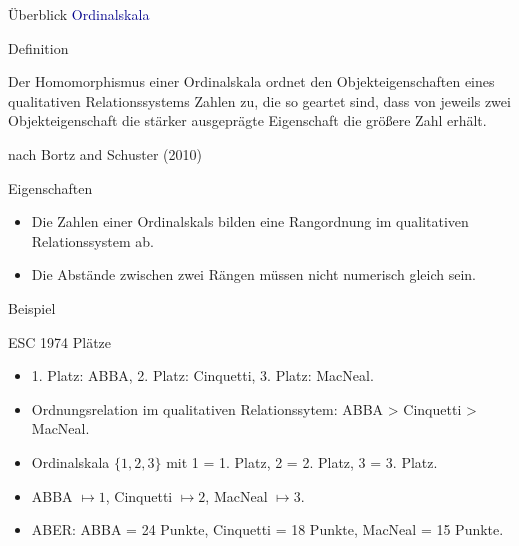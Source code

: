 \documentclass[
  8pt,
  ignorenonframetext,
]{beamer}
\providecommand{\tightlist}{%
  \setlength{\itemsep}{0pt}\setlength{\parskip}{0pt}}
\begin{document}
\begin{frame}{Überblick}
\protect\hypertarget{uxfcberblick-10}{}
\textcolor{darkblue}{Ordinalskala}

Definition

\small

Der Homomorphismus einer Ordinalskala ordnet den Objekteigenschaften
eines qualitativen Relationssystems Zahlen zu, die so geartet sind, dass
von jeweils zwei Objekteigenschaft die stärker ausgeprägte Eigenschaft
die größere Zahl erhält.

\footnotesize
\flushright

nach Bortz and Schuster (2010)

\justifying
\normalsize

Eigenschaften

\small

\begin{itemize}
\tightlist
\item
  Die Zahlen einer Ordinalskals bilden eine Rangordnung im qualitativen
  Relationssystem ab.
\item
  Die Abstände zwischen zwei Rängen müssen nicht numerisch gleich sein.
\end{itemize}

\normalsize

Beispiel

\small

ESC 1974 Plätze

\begin{itemize}
\tightlist
\item
  \footnotesize 1. Platz: ABBA, 2. Platz: Cinquetti, 3. Platz: MacNeal.
\item
  Ordnungsrelation im qualitativen Relationssytem: ABBA \textgreater{}
  Cinquetti \textgreater{} MacNeal.
\item
  Ordinalskala \(\{1,2,3\}\) mit 1 = 1. Platz, 2 = 2. Platz, 3 = 3.
  Platz.
\item
  ABBA \(\mapsto 1\), Cinquetti \(\mapsto 2\), MacNeal \(\mapsto 3\).
\item
  ABER: ABBA = 24 Punkte, Cinquetti = 18 Punkte, MacNeal = 15 Punkte.
\end{itemize}
\end{frame}
\end{document}
